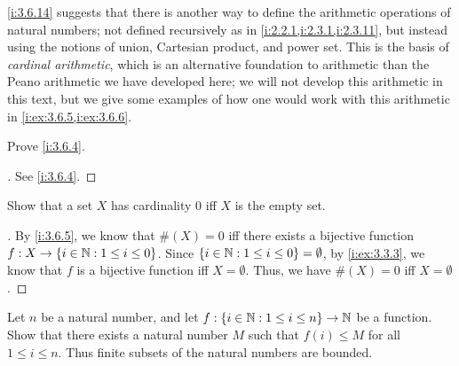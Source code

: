 \begin{rmk}\label{i:3.6.15}
  \cref{i:3.6.14} suggests that there is another way to define the arithmetic operations of natural numbers;
  not defined recursively as in \cref{i:2.2.1,i:2.3.1,i:2.3.11}, but instead using the notions of union, Cartesian product, and power set.
  This is the basis of \emph{cardinal arithmetic}, which is an alternative foundation to arithmetic than the Peano arithmetic we have developed here;
  we will not develop this arithmetic in this text, but we give some examples of how one would work with this arithmetic in \cref{i:ex:3.6.5,i:ex:3.6.6}.
\end{rmk}

\exercisesection

\begin{ex}\label{i:ex:3.6.1}
  Prove \cref{i:3.6.4}.
\end{ex}

\begin{proof}[]
  See \cref{i:3.6.4}.
\end{proof}

\begin{ex}\label{i:ex:3.6.2}
  Show that a set \(X\) has cardinality \(0\) iff \(X\) is the empty set.
\end{ex}

\begin{proof}[]
  By \cref{i:3.6.5}, we know that \(\#(X) = 0\) iff there exists a bijective function \(f : X \to \left\lbrace i \in \mathbb{N} : 1 \leq i \leq 0\right\rbrace\).
  Since \(\left\lbrace i \in \mathbb{N} : 1 \leq i \leq 0\right\rbrace = \emptyset\), by \cref{i:ex:3.3.3}, we know that \(f\) is a bijective function iff \(X = \emptyset\).
  Thus, we have \(\#(X) = 0\) iff \(X = \emptyset\).
\end{proof}

\begin{ex}\label{i:ex:3.6.3}
  Let \(n\) be a natural number, and let \(f : \left\lbrace i \in \mathbb{N} : 1 \leq i \leq n\right\rbrace \to \mathbb{N}\) be a function.
  Show that there exists a natural number \(M\) such that \(f(i) \leq M\) for all \(1 \leq i \leq n\).
  Thus finite subsets of the natural numbers are bounded.
\end{ex}

